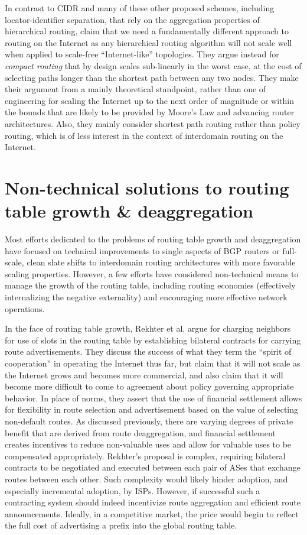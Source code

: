 In contrast to CIDR and many of these other proposed schemes, including
locator-identifier separation, that rely on the aggregation properties of
hierarchical routing, \cite{Krioukov:2007fk} claim that we need a fundamentally
different approach to routing on the Internet as any hierarchical routing
algorithm will not scale well when applied to scale-free ``Internet-like''
topologies. They argue instead for \emph{compact routing} that by design scales
sub-linearly in the worst case, at the cost of selecting paths longer than the
shortest path between any two nodes. They make their argument from a mainly
theoretical standpoint, rather than one of engineering for scaling the Internet
up to the next order of magnitude or within the bounds that are likely to be
provided by Moore's Law and advancing router architectures. Also, they mainly
consider shortest path routing rather than policy routing, which is of less
interest in the context of interdomain routing on the Internet.

\section{Non-technical solutions to routing table growth \& deaggregation}

Most efforts dedicated to the problems of routing table growth and
deaggregation have focused on technical improvements to single aspects of BGP
routers or full-scale, clean slate shifts to interdomain routing architectures
with more favorable scaling properties. However, a few efforts have considered
non-technical means to manage the growth of the routing table, including
routing economies (effectively internalizing the negative externality) and
encouraging more effective network operations.

In the face of routing table growth, Rekhter et al. \cite{Rekhter:1997mi} argue
for charging neighbors for use of slots in the routing table by establishing
bilateral contracts for carrying route advertisements. They discuss the
success of what they term the ``spirit of cooperation'' in operating the
Internet thus far, but claim that it will not scale as the Internet grows
and becomes more commercial, and also claim that it will become more
difficult to come to agreement about policy governing appropriate behavior.
In place of norms, they assert that the use of financial settlement allows
for flexibility in route selection and advertisement based on the value of
selecting non-default routes. As discussed previously, there are
varying degrees of private benefit that are derived from route
deaggregation, and financial settlement creates incentives to reduce
non-valuable uses and allow for valuable uses to be compensated
appropriately. Rekhter's proposal is complex, requiring bilateral
contracts to be negotiated and executed between each pair of ASes that
exchange routes between each other. Such complexity would likely hinder
adoption, and especially incremental adoption, by ISPs. However, if
successful such a contracting system should indeed incentivize route
aggregation and efficient route announcements. Ideally, in a
competitive market, the price would begin to reflect the full cost of
advertising a prefix into the global routing table.

